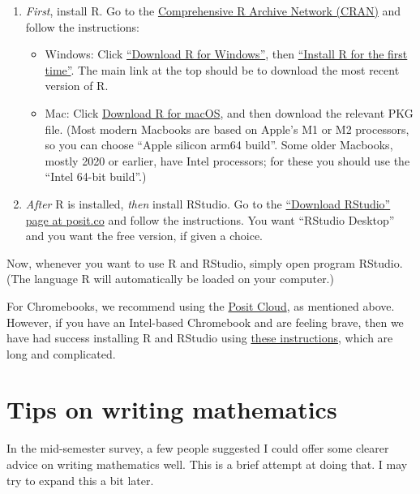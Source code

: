 \documentclass[
  a4paper,
]{book}
\providecommand{\tightlist}{%
  \setlength{\itemsep}{0pt}\setlength{\parskip}{0pt}}
\theoremstyle{definition}
\theoremstyle{definition}
\theoremstyle{definition}
\theoremstyle{definition}
\theoremstyle{remark}
\begin{document}
\begin{enumerate}
\def\labelenumi{\arabic{enumi}.}
\item
  \emph{First}, install R. Go to the \href{https://cran.r-project.org/}{Comprehensive R Archive Network (CRAN)} and follow the instructions:

  \begin{itemize}
  \tightlist
  \item
    Windows: Click \href{https://cran.r-project.org/bin/windows/}{``Download R for Windows''}, then \href{https://cran.r-project.org/bin/windows/base/}{``Install R for the first time''}. The main link at the top should be to download the most recent version of R.
  \item
    Mac: Click \href{https://cran.r-project.org/bin/macosx/}{Download R for macOS}, and then download the relevant PKG file. (Most modern Macbooks are based on Apple's M1 or M2 processors, so you can choose ``Apple silicon arm64 build''. Some older Macbooks, mostly 2020 or earlier, have Intel processors; for these you should use the ``Intel 64-bit build''.)
  \end{itemize}
\item
  \emph{After} R is installed, \emph{then} install RStudio. Go to the \href{https://posit.co/download/rstudio-desktop/}{``Download RStudio'' page at posit.co} and follow the instructions. You want ``RStudio Desktop'' and you want the free version, if given a choice.
\end{enumerate}

Now, whenever you want to use R and RStudio, simply open program RStudio. (The language R will automatically be loaded on your computer.)

For Chromebooks, we recommend using the \href{https://posit.cloud}{Posit Cloud}, as mentioned above. However, if you have an Intel-based Chromebook and are feeling brave, then we have had success installing R and RStudio using \href{https://levente.littvay.hu/chromebook/}{these instructions}, which are long and complicated.

\hypertarget{writing}{%
\chapter*{Tips on writing mathematics}\label{writing}}

In the mid-semester survey, a few people suggested I could offer some clearer advice on writing mathematics well. This is a brief attempt at doing that. I may try to expand this a bit later.
\end{document}
